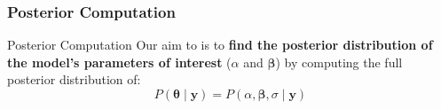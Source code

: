 \subsubsection{Posterior Computation}
\begin{frame}{Posterior Computation}
	Our aim to is to \textbf{find the posterior distribution of the
		model's parameters of interest} ($\alpha$ and $\boldsymbol{\beta}$)
	by computing the full posterior distribution of:
	$$
		P(\boldsymbol{\theta} \mid \boldsymbol{y}) = P(\alpha, \boldsymbol{\beta}, \sigma \mid \boldsymbol{y})
	$$
\end{frame}
